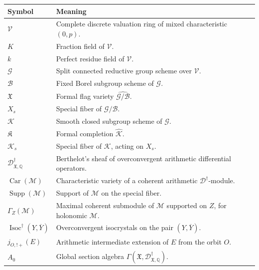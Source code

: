 \documentclass[11pt]{amsart}
\theoremstyle{plain}
\theoremstyle{definition}
\theoremstyle{remark}
\newcommand{\Isoc}{\operatorname{Isoc}}
\newcommand{\Car}{\operatorname{Car}}
\newcommand{\Supp}{\operatorname{Supp}}
\begin{document}
\begin{center}
\begin{tabularx}{\textwidth}{@{}lX@{}}
\toprule
Symbol & Meaning \\
\midrule
\(\mathcal V\) & Complete discrete valuation ring of mixed characteristic \((0,p)\). \\
\(K\) & Fraction field of \(\mathcal V\). \\
\(k\) & Perfect residue field of \(\mathcal V\). \\
\(\mathcal G\) & Split connected reductive group scheme over \(\mathcal V\). \\
\(\mathcal B\) & Fixed Borel subgroup scheme of \(\mathcal G\). \\
\(\mathfrak X\) & Formal flag variety \(\widehat{\mathcal G/\mathcal B}\). \\
\(X_s\) & Special fiber of \(\mathcal G/\mathcal B\). \\
\(\mathcal K\) & Smooth closed subgroup scheme of \(\mathcal G\). \\
\(\mathfrak K\) & Formal completion \(\widehat{\mathcal K}\). \\
\(\mathcal K_s\) & Special fiber of \(\mathcal K\), acting on \(X_s\). \\
\(\mathscr D^\dagger_{\mathfrak X,\mathbb Q}\) & Berthelot's sheaf of overconvergent arithmetic differential operators. \\
\(\Car(\mathcal M)\) & Characteristic variety of a coherent arithmetic \(\mathscr D^\dagger\)-module. \\
\(\Supp(\mathcal M)\) & Support of \(\mathcal M\) on the special fiber. \\
\(\Gamma_Z(\mathcal M)\) & Maximal coherent submodule of \(\mathcal M\) supported on \(Z\), for holonomic \(\mathcal M\). \\
\(\Isoc^\dagger(Y,\overline Y)\) & Overconvergent isocrystals on the pair \((Y,\overline Y)\). \\
\(j_{O,!+}(E)\) & Arithmetic intermediate extension of \(E\) from the orbit \(O\). \\
\(A_0\) & Global section algebra \(\Gamma(\mathfrak X,\mathscr D^\dagger_{\mathfrak X,\mathbb Q})\). \\
\bottomrule
\end{tabularx}
\end{center}

\end{document}
